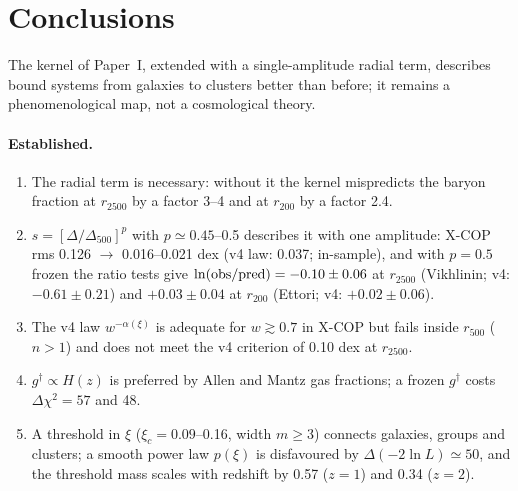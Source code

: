 \documentclass[11pt,a4paper]{article}
\newcommand{\gdag}{g^{\dagger}}
\begin{document}
\section{Conclusions}
The kernel of Paper~I, extended with a single-amplitude radial term, describes bound systems from galaxies to clusters better than before; it remains a phenomenological map, not a cosmological theory.

\paragraph{Established.}
\begin{enumerate}[leftmargin=2em,itemsep=0.1em]
\item The radial term is necessary: without it the kernel mispredicts the baryon fraction at $r_{2500}$ by a factor 3--4 and at $r_{200}$ by a factor 2.4.
\item $s=[\Delta/\Delta_{500}]^p$ with $p\simeq0.45$--0.5 describes it with one amplitude: X-COP rms 0.126 $\to$ 0.016--0.021 dex (v4 law: 0.037; in-sample), and with $p=0.5$ frozen the ratio tests give $\ln({\rm obs/pred})=-0.10\pm0.06$ at $r_{2500}$ (Vikhlinin; v4: $-0.61\pm0.21$) and $+0.03\pm0.04$ at $r_{200}$ (Ettori; v4: $+0.02\pm0.06$).
\item The v4 law $w^{-\alpha(\xi)}$ is adequate for $w\gtrsim0.7$ in X-COP but fails inside $r_{500}$ ($n>1$) and does not meet the v4 criterion of 0.10 dex at $r_{2500}$.
\item $\gdag\propto H(z)$ is preferred by Allen and Mantz gas fractions; a frozen $\gdag$ costs $\Delta\chi^2=57$ and 48.
\item A threshold in $\xi$ ($\xi_c=0.09$--0.16, width $m\ge3$) connects galaxies, groups and clusters; a smooth power law $p(\xi)$ is disfavoured by $\Delta(-2\ln L)\simeq50$, and the threshold mass scales with redshift by 0.57 ($z=1$) and 0.34 ($z=2$).
\end{enumerate}
\end{document}
